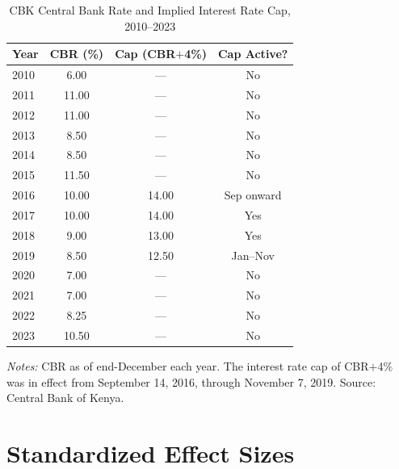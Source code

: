 \documentclass[12pt]{article}
\begin{document}
\begin{table}[H]
\centering
\caption{CBK Central Bank Rate and Implied Interest Rate Cap, 2010--2023}
\label{tab:cbr_timeline}
\begin{threeparttable}
\begin{tabular}{lccc}
\toprule
Year & CBR (\%) & Cap (CBR$+$4\%) & Cap Active? \\
\midrule
2010 & 6.00 & --- & No \\
2011 & 11.00 & --- & No \\
2012 & 11.00 & --- & No \\
2013 & 8.50 & --- & No \\
2014 & 8.50 & --- & No \\
2015 & 11.50 & --- & No \\
2016 & 10.00 & 14.00 & Sep onward \\
2017 & 10.00 & 14.00 & Yes \\
2018 & 9.00 & 13.00 & Yes \\
2019 & 8.50 & 12.50 & Jan--Nov \\
2020 & 7.00 & --- & No \\
2021 & 7.00 & --- & No \\
2022 & 8.25 & --- & No \\
2023 & 10.50 & --- & No \\
\bottomrule
\end{tabular}
\begin{tablenotes}[flushleft]
\small
\item \textit{Notes:} CBR as of end-December each year. The interest rate cap of CBR$+$4\% was in effect from September 14, 2016, through November 7, 2019. Source: Central Bank of Kenya.
\end{tablenotes}
\end{threeparttable}
\end{table}


\section{Standardized Effect Sizes}
\label{sec:sde}
\end{document}
